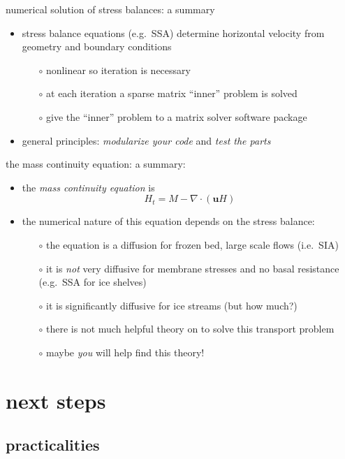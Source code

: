 \documentclass[titlepage,letterpaper,final,11pt]{scrartcl}
\begin{document}
numerical solution of stress balances: a summary

\begin{itemize}
\item stress balance equations (e.g.~SSA) determine horizontal velocity from geometry and boundary conditions
  \begin{itemize}
  \item[$\circ$] nonlinear so iteration is necessary
  \item[$\circ$] at each iteration a sparse matrix ``inner'' problem is solved
  \item[$\circ$] give the ``inner'' problem to a matrix solver software package
  \end{itemize}
\item general principles: \emph{modularize your code} and \emph{test the parts}
\end{itemize}

the mass continuity equation: a summary:

\begin{itemize}
\item the \emph{mass continuity equation} is
  $$H_t = M - \nabla \cdot (\mathbf{u} H)$$
\item the numerical nature of this equation depends on the stress balance:
  \begin{itemize}
  \item[$\circ$] the equation is a diffusion for frozen bed, large scale flows (i.e.~SIA)
  \item[$\circ$] it is \emph{not} very diffusive for membrane stresses and no basal resistance (e.g.~SSA for ice shelves)
  \item[$\circ$] it is significantly diffusive for ice streams (but how much?)
  \item[$\circ$] there is not much helpful theory on to solve this transport problem
  \item[$\circ$] maybe \emph{you} will help find this theory!
  \end{itemize}
\end{itemize}


\section{next steps}

\subsection{practicalities}
\end{document}
